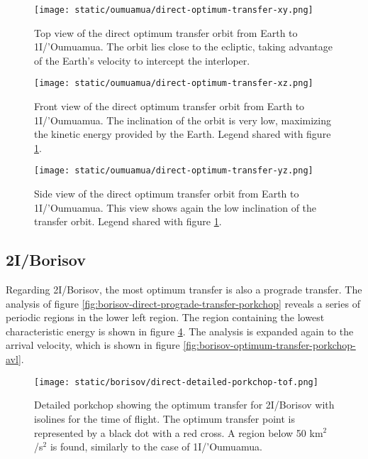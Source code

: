 \begin{figure}[H]
  \centering
  \texttt{[image: static/oumuamua/direct-optimum-transfer-xy.png]}
  \caption[Top view of the direct optimum transfer orbit from Earth to 1I/'Oumuamua]{
    Top view of the direct optimum transfer orbit from Earth to 1I/'Oumuamua.
    The orbit lies close to the ecliptic, taking advantage of the Earth's
    velocity to intercept the interloper.
  }
  \label{fig:optimum_oumuamua_orbit_xy}
\end{figure}

\begin{figure}[H]
  \centering
  \texttt{[image: static/oumuamua/direct-optimum-transfer-xz.png]}
  \caption[Front view of the direct optimum transfer orbit from Earth to 1I/'Oumuamua]{
    Front view of the direct optimum transfer orbit from Earth to 1I/'Oumuamua.
    The inclination of the orbit is very low, maximizing the kinetic energy
    provided by the Earth. Legend shared with figure
    \ref{fig:optimum_oumuamua_orbit_xy}.
  }
  \label{fig:optimum_oumuamua_orbit_yz}
\end{figure}

\begin{figure}[H]
  \centering
  \texttt{[image: static/oumuamua/direct-optimum-transfer-yz.png]}
  \caption[Side view of the direct optimum transfer orbit from Earth to 1I/'Oumuamua]{
    Side view of the direct optimum transfer orbit from Earth to 1I/'Oumuamua.
    This view shows again the low inclination of the transfer orbit. Legend
    shared with figure \ref{fig:optimum_oumuamua_orbit_xy}.}
  \label{fig:optimum_oumuamua_orbit_xz}
\end{figure}

\subsection{2I/Borisov}

Regarding 2I/Borisov, the most optimum transfer is also a prograde transfer. The
analysis of figure \ref{fig:borisov-direct-prograde-transfer-porkchop} reveals a
series of periodic regions in the lower left region. The region containing the
lowest characteristic energy is shown in figure
\ref{fig:borisov-optimum-transfer-porkchop-tof}. The analysis is expanded again
to the arrival velocity, which is shown in figure
\ref{fig:borisov-optimum-transfer-porkchop-avl}.

\begin{figure}[H]
  \centering
  \texttt{[image: static/borisov/direct-detailed-porkchop-tof.png]}
  \caption[Detailed porkchop showing the optimum transfer for
    2I/Borisov with the time of flight.]{Detailed porkchop showing the
    optimum transfer for 2I/Borisov with isolines for the time of flight.
    The optimum transfer point is represented by a black dot with a red cross.
    A region below 50 km$^2$/s$^2$ is found, similarly to the case of
    1I/'Oumuamua.}
  \label{fig:borisov-optimum-transfer-porkchop-tof}
\end{figure}

